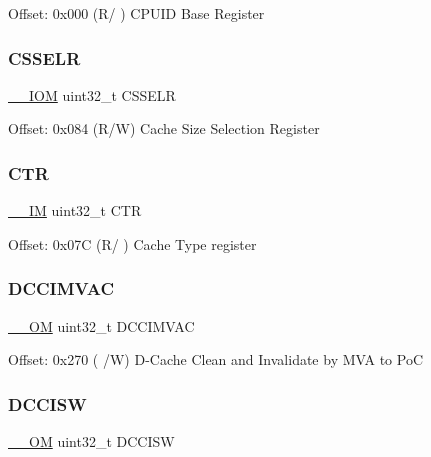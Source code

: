 Offset\+: 0x000 (R/ ) C\+P\+U\+ID Base Register \mbox{\label{struct_s_c_b___type_ae627674bc3ccfc2d67caccfc1f4ea4ed}} 
\subsubsection{\texorpdfstring{C\+S\+S\+E\+LR}{CSSELR}}
{\footnotesize\ttfamily \mbox{\hyperlink{core__cm4_8h_ab6caba5853a60a17e8e04499b52bf691}{\+\_\+\+\_\+\+I\+OM}} uint32\+\_\+t C\+S\+S\+E\+LR}

Offset\+: 0x084 (R/W) Cache Size Selection Register \mbox{\label{struct_s_c_b___type_aad937861e203bb05ae22c4369c458561}} 
\subsubsection{\texorpdfstring{C\+TR}{CTR}}
{\footnotesize\ttfamily \mbox{\hyperlink{core__cm4_8h_a4cc1649793116d7c2d8afce7a4ffce43}{\+\_\+\+\_\+\+IM}} uint32\+\_\+t C\+TR}

Offset\+: 0x07C (R/ ) Cache Type register \mbox{\label{struct_s_c_b___type_a18ef4bf4fbbb205544985598b1bb64f4}} 
\subsubsection{\texorpdfstring{D\+C\+C\+I\+M\+V\+AC}{DCCIMVAC}}
{\footnotesize\ttfamily \mbox{\hyperlink{core__cm4_8h_a0ea2009ed8fd9ef35b48708280fdb758}{\+\_\+\+\_\+\+OM}} uint32\+\_\+t D\+C\+C\+I\+M\+V\+AC}

Offset\+: 0x270 ( /W) D-\/\+Cache Clean and Invalidate by M\+VA to PoC \mbox{\label{struct_s_c_b___type_ab6e447723358e736a9f69ffc88a97ba1}} 
\subsubsection{\texorpdfstring{D\+C\+C\+I\+SW}{DCCISW}}
{\footnotesize\ttfamily \mbox{\hyperlink{core__cm4_8h_a0ea2009ed8fd9ef35b48708280fdb758}{\+\_\+\+\_\+\+OM}} uint32\+\_\+t D\+C\+C\+I\+SW}

